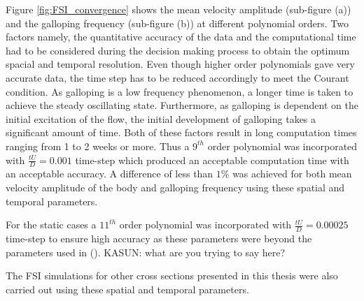 Figure \ref{fig:FSI_convergence} shows the mean velocity amplitude (sub-figure (a)) and the galloping frequency (sub-figure (b)) at different polynomial orders. Two factors namely, the quantitative accuracy of the data and the computational time had to be considered during the decision making process to obtain the optimum spacial and temporal resolution. Even though higher order polynomials gave very accurate data, the time step has to be reduced accordingly to meet the Courant condition. As galloping is a low frequency phenomenon, a longer time is taken to achieve the steady oscillating state. Furthermore, as galloping is dependent on the initial excitation of the flow, the initial development of galloping takes a significant amount of time. Both of these factors result in long computation times ranging from 1 to 2 weeks or more. Thus a $9^{th}$ order polynomial was incorporated with $\frac{tU}{D}=0.001$ time-step which produced an acceptable computation time with an acceptable accuracy. A difference of less than $1\%$ was achieved for both mean velocity amplitude  of the body and galloping frequency using these spatial and temporal parameters.

For the static cases a $11^{th}$ order polynomial was incorporated with $\frac{tU}{D}=0.00025$ time-step to ensure high accuracy as these parameters were beyond the parameters used in \citet{Leontini2013} (). KASUN: what are you trying to say here?


The FSI simulations for other cross sections presented in this thesis were also carried out using these spatial and temporal parameters.     















